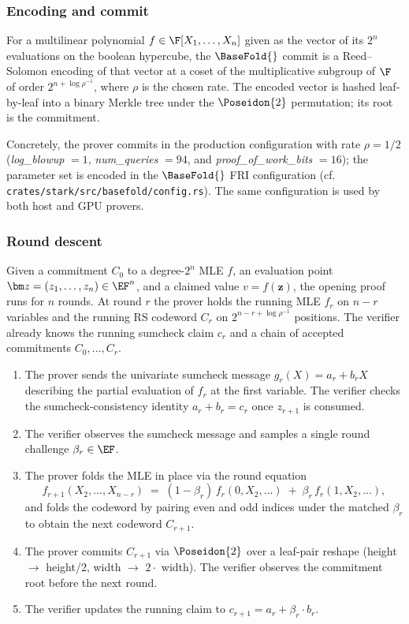 \subsubsection{Encoding and commit}

For a multilinear polynomial $f \in \F[X_1, \ldots, X_n]$ given as the vector of its $2^n$ evaluations on the boolean hypercube, the $\BaseFold{}$ commit is a Reed--Solomon encoding of that vector at a coset of the multiplicative subgroup of $\F$ of order $2^{n + \log \rho^{-1}}$, where $\rho$ is the chosen rate. The encoded vector is hashed leaf-by-leaf into a binary Merkle tree under the $\Poseidon{2}$ permutation; its root is the commitment.

Concretely, the prover commits in the production configuration with rate $\rho = 1/2$ (\textit{log\_blowup} $=1$, \textit{num\_queries} $= 94$, and \textit{proof\_of\_work\_bits} $= 16$); the parameter set is encoded in the $\BaseFold{}$ FRI configuration (cf. \texttt{crates/stark/src/basefold/config.rs}). The same configuration is used by both host and GPU provers.

\subsubsection{Round descent}

Given a commitment $C_0$ to a degree-$2^n$ MLE $f$, an evaluation point $\bm z = (z_1, \ldots, z_n) \in \EF^n$, and a claimed value $v = f(\bm z)$, the opening proof runs for $n$ rounds. At round $r$ the prover holds the running MLE $f_r$ on $n - r$ variables and the running RS codeword $C_r$ on $2^{n - r + \log \rho^{-1}}$ positions. The verifier already knows the running sumcheck claim $c_r$ and a chain of accepted commitments $C_0, \ldots, C_{r}$.

\begin{enumerate}
  \item The prover sends the univariate sumcheck message $g_r(X) = a_r + b_r X$ describing the partial evaluation of $f_r$ at the first variable. The verifier checks the sumcheck-consistency identity $a_r + b_r = c_r$ once $z_{r+1}$ is consumed.
  \item The verifier observes the sumcheck message and samples a single round challenge $\beta_r \in \EF$.
  \item The prover folds the MLE in place via the round equation
  \[
    f_{r+1}(X_2, \ldots, X_{n-r}) \;=\; (1 - \beta_r)\, f_r(0, X_2, \ldots) \;+\; \beta_r\, f_r(1, X_2, \ldots),
  \]
  and folds the codeword by pairing even and odd indices under the matched $\beta_r$ to obtain the next codeword $C_{r+1}$.
  \item The prover commits $C_{r+1}$ via $\Poseidon{2}$ over a leaf-pair reshape (height $\to$ height/2, width $\to$ $2 \cdot$ width). The verifier observes the commitment root before the next round.
  \item The verifier updates the running claim to $c_{r+1} = a_r + \beta_r \cdot b_r$.
\end{enumerate}

